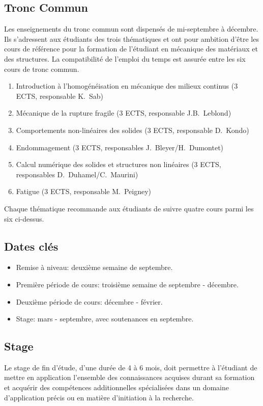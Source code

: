 \documentclass[french,11pt]{article}
\begin{document}
\subsection{Tronc Commun}
Les enseignements du tronc commun sont dispensés de mi-septembre à décembre. 
Ils s'adressent aux étudiants des trois thématiques et ont pour ambition 
d'être les cours de référence pour la formation de l'étudiant en mécanique des matériaux et des structures. 
La compatibilité de l'emploi du temps est assurée entre les six cours de tronc commun.
 \begin{enumerate}
  \item  Introduction à l’homogénéisation en mécanique des milieux continus  (3 ECTS, responsable K.~Sab)
  \item  Mécanique de la rupture fragile (3 ECTS, responsable J.B.~Leblond)
  \item  Comportements non-linéaires des solides (3 ECTS, responsable D.~Kondo)
  \item  Endommagement (3 ECTS, responsables J.~Bleyer/H.~Dumontet)
  \item Calcul numérique des solides et structures non linéaires
    (3 ECTS, responsables D.~Duhamel/C.~Maurini)
  \item  Fatigue (3 ECTS, responsable M.~Peigney)

  \end{enumerate}
Chaque thématique recommande aux étudiants de suivre quatre cours  parmi les six ci-dessus. 

\subsection{Dates clés}
\begin{itemize}
\item Remise à niveau: deuxième semaine de septembre.
\item Première période de cours: troisième semaine de septembre - décembre.
\item Deuxième période de cours: décembre - février.
\item Stage: mars - septembre, avec soutenances en septembre.
\end{itemize}

\subsection{Stage}
Le stage de fin d'étude, d'une durée de 4 à 6 mois, doit permettre à l'étudiant de mettre en application l’ensemble des connaissances acquises durant sa formation et acquérir des compétences additionnelles spécialisées dans un domaine d'application précis ou en 
matière d’initiation à la recherche. 
\end{document}
